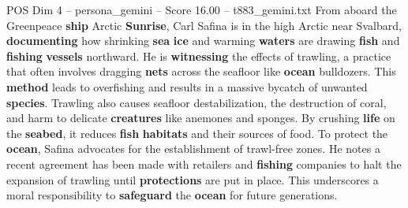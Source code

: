 \begin{textsample}{POS Dim 4 – persona\_gemini – Score 16.00 – t883\_gemini.txt}  \label{ex:f4_pos_043}
From aboard the Greenpeace \textbf{ship} Arctic \textbf{Sunrise}, Carl Safina is in the high Arctic near Svalbard, \textbf{documenting} how shrinking \textbf{sea} \textbf{ice} and warming \textbf{waters} are drawing \textbf{fish} and \textbf{fishing} \textbf{vessels} northward.
He is \textbf{witnessing} the effects of trawling, a practice that often involves dragging \textbf{nets} across the seafloor like \textbf{ocean} bulldozers.
This \textbf{method} leads to overfishing and results in a massive bycatch of unwanted \textbf{species}.
Trawling also causes seafloor destabilization, the destruction of coral, and harm to delicate \textbf{creatures} like anemones and sponges.
By crushing \textbf{life} on the \textbf{seabed}, it reduces \textbf{fish} \textbf{habitats} and their sources of food.
To protect the \textbf{ocean}, Safina advocates for the establishment of trawl-free zones.
He notes a recent agreement has been made with retailers and \textbf{fishing} companies to halt the expansion of trawling until \textbf{protections} are put in place.
This underscores a moral responsibility to \textbf{safeguard} the \textbf{ocean} for future generations.

\end{textsample}
